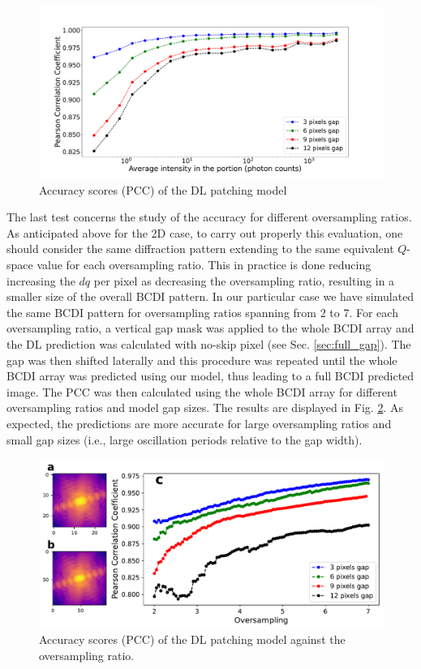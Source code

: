 \begin{figure}[ht]
    \centering
    \includegraphics[width=\textwidth]{figures/Inpainting/1D_Acc_Intensity.pdf}
    \caption{Accuracy scores (PCC) of the DL patching model }
    \label{fig:acc_int_3D}
\end{figure}

The last test concerns the study of the accuracy for different oversampling ratios. As anticipated above for the 2D case, 
to carry out properly this evaluation, one should consider the same diffraction pattern extending to the same equivalent
$Q$-space value for each oversampling ratio. This in practice is done reducing increasing the $dq$ per pixel as decreasing
the oversampling ratio, resulting in a smaller size of the overall BCDI pattern. In our particular case we have simulated
the same BCDI pattern for oversampling ratios spanning from 2 to 7. For each oversampling ratio, a vertical gap
mask was applied to the whole BCDI array and the DL prediction was calculated with no-skip pixel (see Sec. \ref{sec:full_gap}).
The gap was then shifted laterally and this procedure was repeated until the whole BCDI array was predicted using our
model, thus leading to a full BCDI predicted image. The PCC was then calculated using the whole BCDI array for 
different oversampling ratios and model gap sizes. The results are displayed in Fig. \ref{fig:acc_ovs_3D}. As expected,
the predictions are more accurate for large oversampling ratios and small gap sizes (i.e., large oscillation periods 
relative to the gap width). 

\begin{figure}[ht]
    \centering
    \includegraphics[width=\textwidth]{figures/Inpainting/accuracy_oversampling.pdf}
    \caption{Accuracy scores (PCC) of the DL patching model against the oversampling ratio. }
    \label{fig:acc_ovs_3D}
\end{figure}

